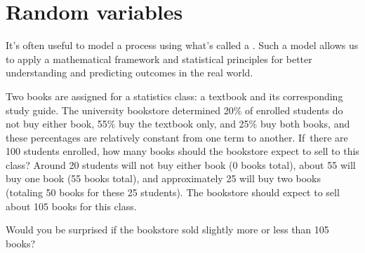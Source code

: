 \section{Random variables}
\label{randomVariablesSection}


\noindent%
It's often useful to model a process using what's
called a .
Such a model allows us to apply a mathematical
framework and statistical principles for
better understanding and predicting outcomes
in the real world.

\begin{examplewrap}
\begin{nexample}{Two books are assigned for a statistics class: a textbook and its corresponding study guide. The university bookstore determined 20\% of enrolled students do not buy either book, 55\% buy the textbook only, and 25\% buy both books, and these percentages are relatively constant from one term to another. If~there are 100 students enrolled, how many books should the bookstore expect to sell to this class?}\label{bookStoreSales}
Around 20 students will not buy either book (0 books total), about 55 will buy one book (55 books total), and approximately 25 will buy two books (totaling 50 books for these 25 students). The bookstore should expect to sell about 105 books for this class.
\end{nexample}
\end{examplewrap}

\begin{exercisewrap}
\begin{nexercise}
Would you be surprised if the bookstore sold slightly more or less than 105 books?\footnotemark
\end{nexercise}
\end{exercisewrap}

